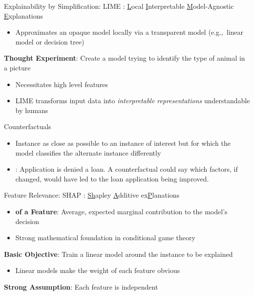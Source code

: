 \documentclass[11pt,dvipsnames,usenames,aspectratio=169]{beamer}  %
\begin{document}
\begin{frame}{Explainability by Simplification: LIME}
  \noindent
  \textbf{}: \underline{L}ocal \underline{I}nterpretable \underline{M}odel-Agnostic \underline{E}xplanations~\citep{Ribeiro:2016}
  \begin{itemize}
    \item Approximates an opaque model locally via a transparent model (e.g.,~linear model or decision tree)
  \end{itemize}

  \vspace{18pt}
  \noindent
  \textbf{Thought Experiment}: Create a model trying to identify the type of animal in a picture
  \begin{itemize}
    \item Necessitates high level features
    \item LIME transforms input data into \textit{interpretable representations} understandable by humans
  \end{itemize}
\end{frame}

\begin{frame}{Counterfactuals}
  \begin{itemize}
    \setlength{\itemsep}{18pt}
    \item Instance as close as possible to an instance of interest but for which the model classifies the alternate instance differently

    \item \textit{}: Application is denied a loan.  A counterfactual could say which factors, if changed, would have led to the loan application being improved.
  \end{itemize}
\end{frame}

\begin{frame}{Feature Relevance: SHAP}
  \noindent
  \textbf{}: \underline{Sh}apley \underline{A}dditive ex\underline{P}lanations~\citep{Lundberg:2017}
  \begin{itemize}
    \item \textbf{ of a Feature}: Average, expected marginal contribution to the model's decision
    \item Strong mathematical foundation in conditional game theory
  \end{itemize}

  \vspace{18pt}
  \noindent
  \textbf{Basic Objective}: Train a linear model around the instance to be explained
  \begin{itemize}
    \item Linear models make the weight of each feature obvious
  \end{itemize}

  \vspace{18pt}
  \noindent
  \textbf{Strong Assumption}: Each feature is independent
\end{frame}
\end{document}
